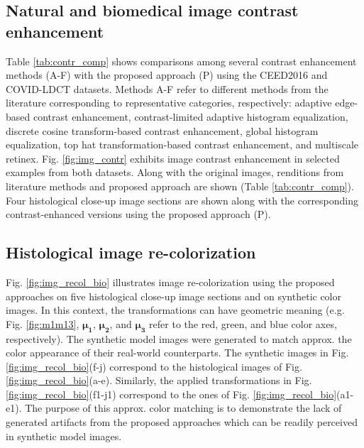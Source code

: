 \documentclass[superscriptaddress,longbibliography,aps,prl,twocolumn,10pt]{revtex4-2}
\begin{document}
\subsection*{\normalsize{Natural and biomedical image contrast enhancement}}
Table \ref{tab:contr_comp} shows comparisons among several contrast enhancement methods (A-F) with the proposed approach (P) using the CEED2016 \cite{Qureshi2016, Qureshi2017} and COVID-LDCT \cite{Afshar2021} datasets. Methods A-F refer to different methods from the literature \cite{Beghdadi1989, Zuiderveld1994, Mukherjee2008, Hummel1977, Mukhopadhyay2000, Chen2010, Qureshi2016} corresponding to representative categories, respectively: adaptive edge-based contrast enhancement, contrast-limited adaptive histogram equalization, discrete cosine transform-based contrast enhancement, global histogram equalization, top hat transformation-based contrast enhancement, and multiscale retinex. Fig. \ref{fig:img_contr} exhibits image contrast enhancement in selected examples from both datasets. Along with the original images, renditions from literature methods and proposed approach are shown (Table \ref{tab:contr_comp}). Four histological close-up image sections are shown along with the corresponding contrast-enhanced versions using the proposed approach (P).

\subsection*{\normalsize{Histological image re-colorization}}
Fig. \ref{fig:img_recol_bio} illustrates image re-colorization using the proposed approaches on five histological close-up image sections and on synthetic color images. In this context, the transformations can have geometric meaning (e.g. Fig. \ref{fig:m1m13}, $\boldsymbol{\mu_1}$, $\boldsymbol{\mu_2}$, and $\boldsymbol{\mu_3}$ refer to the red, green, and blue color axes, respectively). The synthetic model images were generated to match approx. the color appearance of their real-world counterparts. The synthetic images in Fig. \ref{fig:img_recol_bio}(f-j) correspond to the histological images of Fig. \ref{fig:img_recol_bio}(a-e). Similarly, the applied transformations in Fig. \ref{fig:img_recol_bio}(f1-j1) correspond to the ones of Fig. \ref{fig:img_recol_bio}(a1-e1). The purpose of this approx. color matching is to demonstrate the lack of generated artifacts from the proposed approaches which can be readily perceived in synthetic model images.
\end{document}
